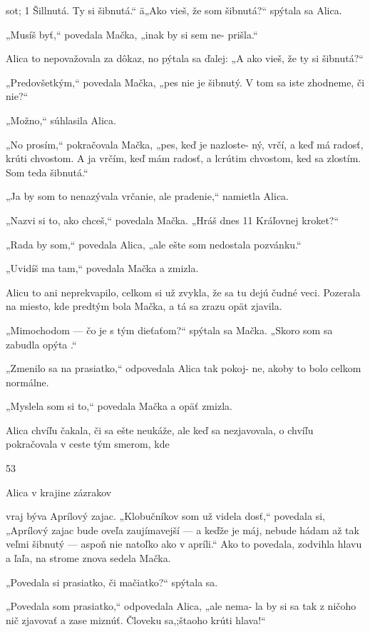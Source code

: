 \documentclass[12pt]{book}
\begin{document}
\begin{Parallel}[p]{}{}
{ 

sot; 1  Šillnutá.  Ty si šibnutá.“
ä„Ako vieš, že som šibnutá?“ spýtala sa Alica.

„Musíš byť,“ povedala Mačka, „inak by si sem ne-
prišla.“

Alica to nepovažovala za dôkaz, no pýtala sa ďalej: „A
ako vieš, že ty si šibnutá?“

„Predovšetkým,“ povedala Mačka, „pes nie je šibnutý.
V tom sa iste zhodneme, či nie?“

„Možno,“ súhlasila Alica.

„No prosím,“ pokračovala Mačka, „pes, keď je nazloste-
ný, vrčí, a keď má radosť, krúti chvostom. A ja vrčím, keď
mám radosť, a lcrútim chvostom, ked sa zlostím. Som teda
šibnutá.“

„Ja by som to nenazývala vrčanie, ale pradenie,“ namietla
Alica.

„Nazvi si to, ako chceš,“ povedala Mačka. „Hráš dnes
11 Kráľovnej kroket?“

„Rada by som,“ povedala Alica, „ale ešte som nedostala
pozvánku.“

„Uvidíš ma tam,“ povedala Mačka a zmizla.

Alicu to ani neprekvapilo, celkom si už zvykla, že sa tu
dejú čudné veci. Pozerala na miesto, kde predtým bola
Mačka, a tá sa zrazu opät zjavila.

„Mimochodom — čo je s tým dieťaťom?“ spýtala sa
Mačka. „Skoro som sa zabudla opýta .“

„Zmenilo sa na prasiatko,“ odpovedala Alica tak pokoj-
ne, akoby to bolo celkom normálne.

„Myslela som si to,“ povedala Mačka a opäť zmizla.

Alica chvíľu čakala, či sa ešte neukáže, ale keď sa
nezjavovala, o chvíľu pokračovala v ceste tým smerom, kde

53

 

 

 

 

Alica v krajine zázrakov

vraj býva Aprílový zajac. „Klobučníkov som už videla
dosť,“ povedala si, „Aprílový zajac bude oveľa zaujímavejší
— a keďže je máj, nebude hádam až tak veľmi šibnutý
— aspoň nie natoľko ako v apríli.“ Ako to povedala,
zodvihla hlavu a ľaľa, na strome znova sedela Mačka.

„Povedala si prasiatko, či mačiatko?“ spýtala sa.

„Povedala som prasiatko,“ odpovedala Alica, „ale nema-
la by si sa tak z ničoho nič zjavovať a zase miznúť. Človeku
sa,;štaoho krúti hlava!“

}
\end{Parallel}
\end{document}
